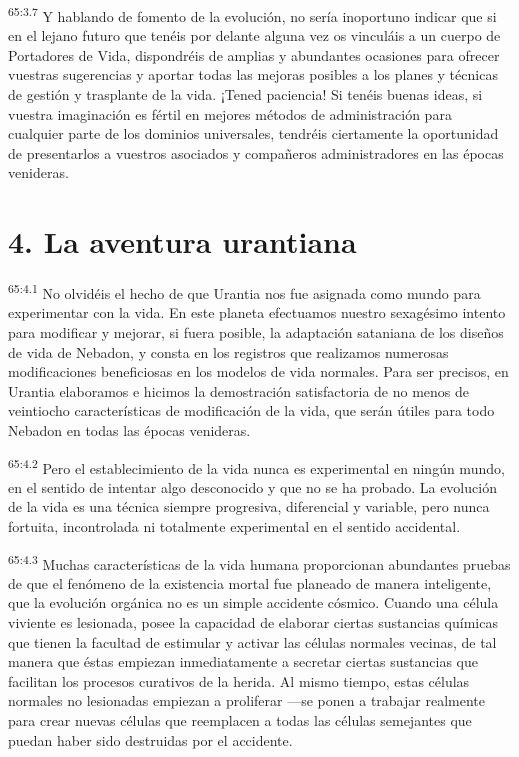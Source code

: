 \par
\textsuperscript{65:3.7} Y hablando de fomento de la evolución, no sería inoportuno indicar que si en el lejano futuro que tenéis por delante alguna vez os vinculáis a un cuerpo de Portadores de Vida, dispondréis de amplias y abundantes ocasiones para ofrecer vuestras sugerencias y aportar todas las mejoras posibles a los planes y técnicas de gestión y trasplante de la vida. ¡Tened paciencia! Si tenéis buenas ideas, si vuestra imaginación es fértil en mejores métodos de administración para cualquier parte de los dominios universales, tendréis ciertamente la oportunidad de presentarlos a vuestros asociados y compañeros administradores en las épocas venideras.

\section*{4. La aventura urantiana}
\par
\textsuperscript{65:4.1} No olvidéis el hecho de que Urantia nos fue asignada como mundo para experimentar con la vida. En este planeta efectuamos nuestro sexagésimo intento para modificar y mejorar, si fuera posible, la adaptación sataniana de los diseños de vida de Nebadon, y consta en los registros que realizamos numerosas modificaciones beneficiosas en los modelos de vida normales. Para ser precisos, en Urantia elaboramos e hicimos la demostración satisfactoria de no menos de veintiocho características de modificación de la vida, que serán útiles para todo Nebadon en todas las épocas venideras.

\par
\textsuperscript{65:4.2} Pero el establecimiento de la vida nunca es experimental en ningún mundo, en el sentido de intentar algo desconocido y que no se ha probado. La evolución de la vida es una técnica siempre progresiva, diferencial y variable, pero nunca fortuita, incontrolada ni totalmente experimental en el sentido accidental.

\par
\textsuperscript{65:4.3} Muchas características de la vida humana proporcionan abundantes pruebas de que el fenómeno de la existencia mortal fue planeado de manera inteligente, que la evolución orgánica no es un simple accidente cósmico. Cuando una célula viviente es lesionada, posee la capacidad de elaborar ciertas sustancias químicas que tienen la facultad de estimular y activar las células normales vecinas, de tal manera que éstas empiezan inmediatamente a secretar ciertas sustancias que facilitan los procesos curativos de la herida. Al mismo tiempo, estas células normales no lesionadas empiezan a proliferar ---se ponen a trabajar realmente para crear nuevas células que reemplacen a todas las células semejantes que puedan haber sido destruidas por el accidente.

